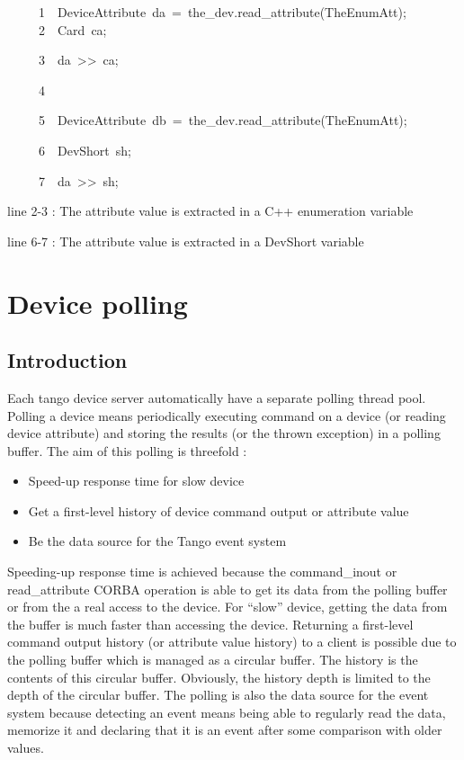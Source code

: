 \begin{lyxcode}
~~~~~1~~DeviceAttribute~da~=~the\_dev.read\_attribute(\textquotedbl{}TheEnumAtt\textquotedbl{});
~~~~~2~~Card~ca;

~~~~~3~~da~>\textcompwordmark{}>~ca;

~~~~~4~~

~~~~~5~~DeviceAttribute~db~=~the\_dev.read\_attribute(\textquotedbl{}TheEnumAtt\textquotedbl{});

~~~~~6~~DevShort~sh;

~~~~~7~~da~>\textcompwordmark{}>~sh;
\end{lyxcode}


line 2-3 : The attribute value is extracted in a C++ enumeration variable

line 6-7 : The attribute value is extracted in a DevShort variable

\section{Device polling}

\subsection{Introduction}

Each tango device server automatically have a separate polling
thread pool. Polling a device means periodically executing command
on a device (or reading device attribute) and storing the results
(or the thrown exception) in a polling buffer. The aim of this polling
is threefold :
\begin{itemize}
\item Speed-up response time for slow device
\item Get a first-level history of device command output or attribute value
\item Be the data source for the Tango event system
\end{itemize}
Speeding-up response time is achieved because the command\_inout or
read\_attribute CORBA operation is able to get its data from the polling
buffer or from the a real access to the device. For ``slow'' device,
getting the data from the buffer is much faster than accessing the
device. Returning a first-level command output history (or attribute
value history) to a client is possible due to the polling buffer which
is managed as a circular buffer. The history is the contents of this
circular buffer. Obviously, the history depth is limited to the depth
of the circular buffer. The polling is also the data source for the
event system because detecting an event means being able to regularly
read the data, memorize it and declaring that it is an event after
some comparison with older values.

